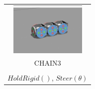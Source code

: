 \documentclass{standalone}
\newcommand{\picHeight}{1in}
\begin{document}
        \begin{tabular}{| c |}
            \hline
            \includegraphics[height=\picHeight]{three.png} %
             \\ 
            CHAIN3
            \\ \hline
            
            \pbox{20cm}{\(Drive(v,t)\), \(SteeringPose()\), \(LegStep()\), \\ \(HoldRigid()\), \(Steer(\theta)\) }
            \\ \hline
        \end{tabular}
\end{document}
